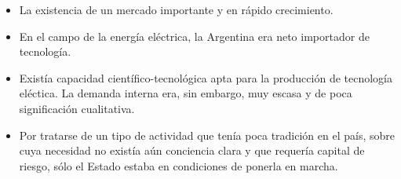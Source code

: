 \begin{itemize}
    \item La existencia de un mercado importante y en rápido crecimiento.
    \item En el campo de la energía eléctrica, la Argentina era neto importador de tecnología.
    \item Existía capacidad científico-tecnológica apta para la producción de tecnología eléctica. La demanda interna era, sin embargo, muy escasa y de poca significación cualitativa.
    \item Por tratarse de un tipo de actividad que tenía poca tradición en el país, sobre cuya necesidad no existía aún conciencia clara y que requería capital de riesgo, sólo el Estado estaba en condiciones de ponerla en marcha.
\end{itemize}

